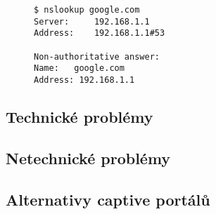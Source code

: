 \documentclass[thesis=M,czech]{FITthesis}[2012/10/20]
\renewcommand{\lstlistingname}{Ukázka kódu}
\begin{document}
\begin{figure}[h]
  \renewcommand{\lstlistingname}{Ukázka}
  \begin{lstlisting}[label=verb:dns-mitm, caption={Ukázka podvržení DNS odpovědi},frame=single]
$ nslookup google.com
Server:		192.168.1.1
Address:	192.168.1.1#53

Non-authoritative answer:
Name:	google.com
Address: 192.168.1.1
  \end{lstlisting}
\end{figure}


\subsection{Technické problémy}




\subsection{Netechnické problémy}

%

\subsection{Alternativy captive portálů}

\end{document}
